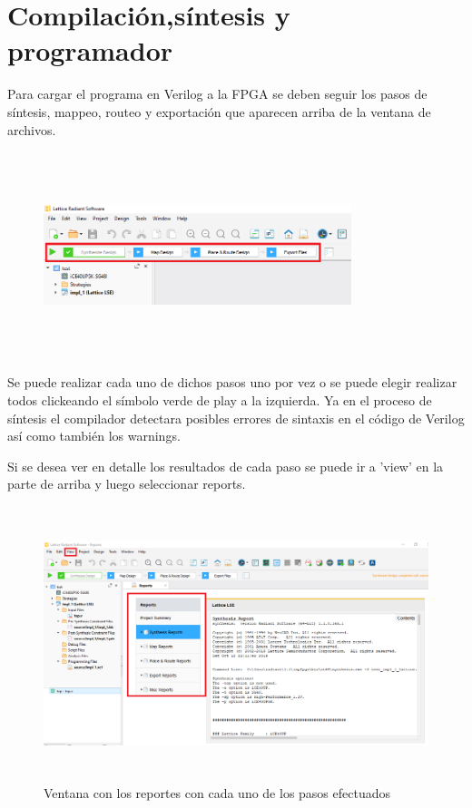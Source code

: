 \documentclass{article}
\begin{document}
\section{Compilación,síntesis y programador}
Para cargar el programa en Verilog a la FPGA se deben seguir los pasos de síntesis, mappeo, routeo y exportación que aparecen arriba de la ventana de archivos.
	\begin{figure}[H]
 	\centering
	\includegraphics[height=6cm, width=0.8\textwidth]{Imagenes/SintesisRouteo.png}
	\end{figure}
Se puede realizar cada uno de dichos pasos uno por vez o se puede elegir realizar todos clickeando el símbolo verde de play a la izquierda. Ya en el proceso de síntesis el compilador detectara posibles errores de sintaxis en el código de Verilog así como también los warnings.

Si se desea ver en detalle los resultados de cada paso se puede ir a 'view' en la parte de arriba y luego seleccionar reports.
	\begin{figure}[H]
 	\centering
	\includegraphics[height=8cm, width=\textwidth]{Imagenes/reports.png}
	\caption{Ventana con los reportes con cada uno de los pasos efectuados}
	\end{figure}
	
\end{document}

